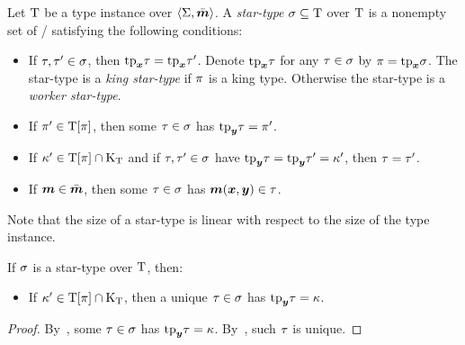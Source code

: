 \begin{definition}
Let $\mathrm{T}$ be a type instance over $\left\langle \mathrm{\Sigma},\bar{\bm{m}} \right\rangle$.
A \emph{star-type} $\sigma \subseteq \mathrm{T}$ over $\mathrm{T}$ is a nonempty
set of \twotypes/ satisfying the following conditions:
\begin{itemize}
  \item[\condstpx]\label{cond:stpx}
  If $\tau, {\tau'} \in \sigma$, then $\mathrm{tp}_{\bm{x}}\tau = \mathrm{tp}_{\bm{x}}{\tau'}$.
  Denote $\mathrm{tp}_{\bm{x}}\tau$ for any $\tau \in \sigma$ by $\pi=\mathrm{tp}_{\bm{x}}\sigma$.
  The star-type is a \emph{king star-type} if $\pi$ is a king type.
  Otherwise the star-type is a \emph{worker star-type}.
  
  \item[\condstppy]\label{cond:stppy}
  If ${\pi'} \in \mathrm{T}[\pi]$, then some $\tau\in\sigma$ has
  $\mathrm{tp}_{\bm{y}}\tau = {\pi'}$.
  
  \item[\condstpky]\label{cond:stpky}
  If ${\kappa'} \in \mathrm{T}[\pi]\cap{\mathrm{K}}_{\mathrm{T}}$
  and if $\tau,{\tau'} \in \sigma$ have $\mathrm{tp}_{\bm{y}}\tau = \mathrm{tp}_{\bm{y}}{\tau'} = {\kappa'}$,
  then $\tau = {\tau'}$.
  
  \item[\condstpm]\label{cond:stpm}
  If $\bm{m} \in \bar{\bm{m}}$, then some $\tau\in\sigma$ has $\bm{m}(\bm{x},\bm{y}) \in \tau$.
\end{itemize}
\end{definition}
Note that the size of a star-type is linear with respect to the size of the type
instance.
\begin{remark}
If $\sigma$ is a star-type over $\mathrm{T}$, then:
\begin{itemize}
  \item[\condstpkyu]\label{cond:stpkyu}
  If ${\kappa'} \in \mathrm{T}[\pi]\cap{\mathrm{K}}_{\mathrm{T}}$,
  then a unique $\tau\in\sigma$ has $\mathrm{tp}_{\bm{y}}\tau = \kappa$.
\end{itemize}
\end{remark}
\begin{proof}
By~, some $\tau\in\sigma$ has $\mathrm{tp}_{\bm{y}}\tau = \kappa$.
By~, such $\tau$ is unique.
\end{proof}

